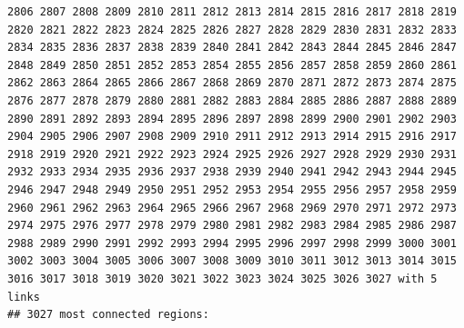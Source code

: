 \documentclass[11pt,]{article}
\begin{document}
\begin{verbatim}
2806 2807 2808 2809 2810 2811 2812 2813 2814 2815 2816 2817 2818 2819 2820 2821 2822 2823 2824 2825 2826 2827 2828 2829 2830 2831 2832 2833 2834 2835 2836 2837 2838 2839 2840 2841 2842 2843 2844 2845 2846 2847 2848 2849 2850 2851 2852 2853 2854 2855 2856 2857 2858 2859 2860 2861 2862 2863 2864 2865 2866 2867 2868 2869 2870 2871 2872 2873 2874 2875 2876 2877 2878 2879 2880 2881 2882 2883 2884 2885 2886 2887 2888 2889 2890 2891 2892 2893 2894 2895 2896 2897 2898 2899 2900 2901 2902 2903 2904 2905 2906 2907 2908 2909 2910 2911 2912 2913 2914 2915 2916 2917 2918 2919 2920 2921 2922 2923 2924 2925 2926 2927 2928 2929 2930 2931 2932 2933 2934 2935 2936 2937 2938 2939 2940 2941 2942 2943 2944 2945 2946 2947 2948 2949 2950 2951 2952 2953 2954 2955 2956 2957 2958 2959 2960 2961 2962 2963 2964 2965 2966 2967 2968 2969 2970 2971 2972 2973 2974 2975 2976 2977 2978 2979 2980 2981 2982 2983 2984 2985 2986 2987 2988 2989 2990 2991 2992 2993 2994 2995 2996 2997 2998 2999 3000 3001 3002 3003 3004 3005 3006 3007 3008 3009 3010 3011 3012 3013 3014 3015 3016 3017 3018 3019 3020 3021 3022 3023 3024 3025 3026 3027 with 5 links
## 3027 most connected regions:

\end{verbatim}
\end{document}
